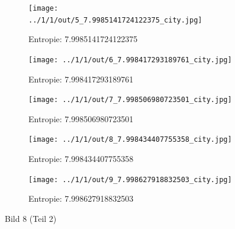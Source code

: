 \begin{figure}
	\centering

	\begin{subfigure}{0.25\textwidth}
		\texttt{[image: ../1/1/out/5\_7.9985141724122375\_city.jpg]}
		\caption{Entropie: 7.9985141724122375}
	\end{subfigure}

	\begin{subfigure}{0.25\textwidth}
		\texttt{[image: ../1/1/out/6\_7.998417293189761\_city.jpg]}
		\caption{Entropie: 7.998417293189761}
	\end{subfigure}

	\begin{subfigure}{0.25\textwidth}
		\texttt{[image: ../1/1/out/7\_7.998506980723501\_city.jpg]}
		\caption{Entropie: 7.998506980723501}
	\end{subfigure}

	\begin{subfigure}{0.25\textwidth}
		\texttt{[image: ../1/1/out/8\_7.998434407755358\_city.jpg]}
		\caption{Entropie: 7.998434407755358}
	\end{subfigure}

	\begin{subfigure}{0.25\textwidth}
		\texttt{[image: ../1/1/out/9\_7.998627918832503\_city.jpg]}
		\caption{Entropie: 7.998627918832503}
	\end{subfigure}

	\caption{Bild 8 (Teil 2)}
\end{figure}

